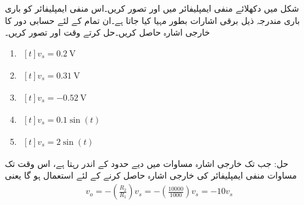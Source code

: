 شکل  میں دکھلائے منفی ایمپلیفائر میں  اور  تصور کریں۔اس منفی ایمپلیفائر کو باری باری مندرجہ ذیل برقی اشارات بطور  مہیا کیا جاتا ہے۔ان تمام کے لئے حسابی دور کا خارجی اشارہ  حاصل کریں۔حل کرتے وقت  اور  تصور کریں۔
\begin{enumerate}
\item $\begin{aligned}[t]
v_s = \SI{0.2}{\volt}
\end{aligned}$
\item $\begin{aligned}[t]
v_s = \SI{0.31}{\volt}
\end{aligned}$

\item $\begin{aligned}[t]
v_s = \SI{-0.52}{\volt}
\end{aligned}$

\item $\begin{aligned}[t]
v_s = 0.1 \sin \left (t \right )
\end{aligned}$

\item $\begin{aligned}[t]
v_s = 2 \sin \left ( t \right )
\end{aligned}$
\end{enumerate}
حل:	جب تک خارجی اشارہ  مساوات   میں دیے حدود کے اندر رہتا ہے، اس وقت تک مساوات   منفی ایمپلیفائر کی خارجی اشارہ  حاصل کرنے کے لئے استعمال ہو گا یعنی
\begin{align*}
v_o = - \left ( \frac{R_2}{R_1} \right ) v_s = -\left ( \frac{10000}{1000} \right ) v_s=-10 v_s
\end{align*}
%
